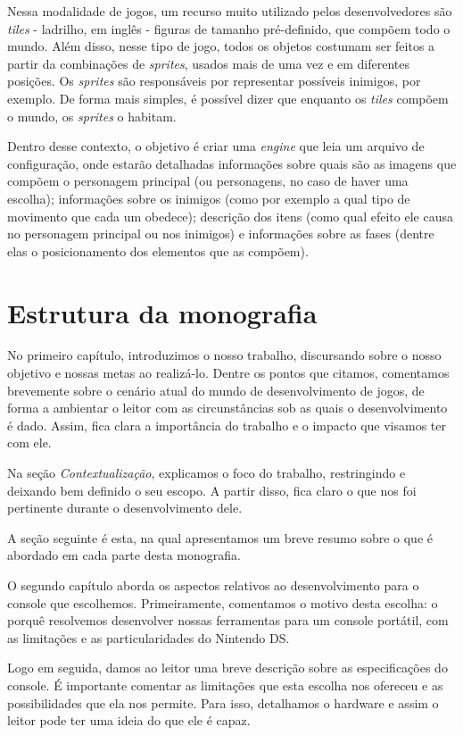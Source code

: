 \documentclass[brazil]{abnt}
\begin{document}
Nessa modalidade de jogos, um recurso muito utilizado pelos desenvolvedores são \textit{tiles} - ladrilho, em inglês - figuras de tamanho pré-definido, que compõem todo o mundo. Além disso, nesse tipo de jogo, todos os objetos costumam ser feitos a partir da combinações de \textit{sprites}, usados mais de uma vez e em diferentes posições. Os \textit{sprites} são responsáveis por representar possíveis inimigos, por exemplo. De forma mais simples, é possível dizer que enquanto os \textit{tiles} compõem o mundo, os \textit{sprites} o habitam.

Dentro desse contexto, o objetivo é criar uma \textit{engine} que leia um arquivo de configuração, onde estarão detalhadas informações sobre quais são as imagens que compõem o personagem principal (ou personagens, no caso de haver uma escolha); informações sobre os inimigos (como por exemplo a qual tipo de movimento que cada um obedece); descrição dos itens (como qual efeito ele causa no personagem principal ou nos inimigos) e informações sobre as fases (dentre elas o posicionamento dos elementos que as compõem).

\section{Estrutura da monografia}

No primeiro capítulo, introduzimos o nosso trabalho, discursando sobre o nosso objetivo e nossas metas ao realizá-lo. Dentre os pontos que citamos, comentamos brevemente sobre o cenário atual do mundo de desenvolvimento de jogos, de forma a ambientar o leitor com as circunstâncias sob as quais o desenvolvimento é dado. Assim, fica clara a importância do trabalho e o impacto que visamos ter com ele.

Na seção \textit{Contextualização}, explicamos o foco do trabalho, restringindo e deixando bem definido o seu escopo. A partir disso, fica claro o que nos foi pertinente durante o desenvolvimento dele.

A seção seguinte é esta, na qual apresentamos um breve resumo sobre o que é abordado em cada parte desta monografia.

O segundo capítulo aborda os aspectos relativos ao desenvolvimento para o console que escolhemos. Primeiramente, comentamos o motivo desta escolha: o porquê resolvemos desenvolver nossas ferramentas para um console portátil, com as limitações e as particularidades do Nintendo DS.

Logo em seguida, damos ao leitor uma breve descrição sobre as especificações do console. É importante comentar as limitações que esta escolha nos ofereceu e as possibilidades que ela nos permite. Para isso, detalhamos o hardware e assim o leitor pode ter uma ideia do que ele é capaz.
\end{document}
